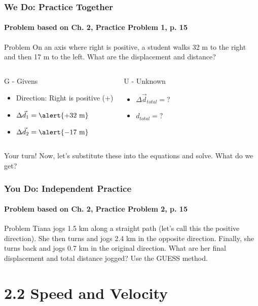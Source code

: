 \documentclass{beamer}
\begin{document}
\begin{frame}
\frametitle{We Do: Practice Together}
\framesubtitle{Problem based on Ch. 2, Practice Problem 1, p. 15}
\begin{block}{Problem}
On an axis where right is positive, a student walks 32 m to the right and then 17 m to the left. What are the displacement and distance?
\end{block}
\pause
\begin{columns}[T]
\begin{block}{G - Givens}
\begin{itemize}
    \item Direction: Right is positive (+)
    \item $\Delta \vec{d}_1 = \alert{+32 \text{ m}}$
    \item $\Delta \vec{d}_2 = \alert{-17 \text{ m}}$
\end{itemize}
\end{block}
\begin{block}{U - Unknown}
\begin{itemize}
    \item $\Delta \vec{d}_{total} = ?$
    \item $d_{total} = ?$
\end{itemize}
\end{block}
\end{columns}
\pause
\begin{alertblock}{Your turn!}
Now, let's substitute these into the equations and solve. What do we get?
\end{alertblock}
\end{frame}

\begin{frame}
\frametitle{You Do: Independent Practice}
\framesubtitle{Problem based on Ch. 2, Practice Problem 2, p. 15}
\begin{block}{Problem}
Tiana jogs 1.5 km along a straight path (let's call this the positive direction). She then turns and jogs 2.4 km in the opposite direction. Finally, she turns back and jogs 0.7 km in the original direction.
\newline\newline
What are her final displacement and total distance jogged? Use the GUESS method.
\end{block}
\end{frame}

\section{2.2 Speed and Velocity}
\end{document}
